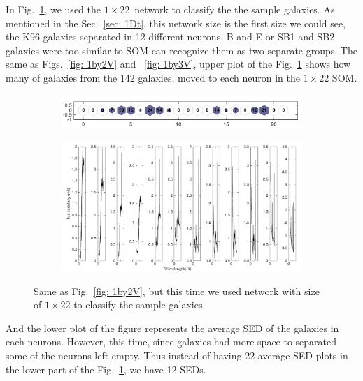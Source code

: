             In Fig.~\ref{fig: 1by22V}, we used the $1\times22$~network to classify the the sample galaxies.
            As mentioned in the Sec.~\ref{sec: 1Dt}, this network size is the first size we could see, the K96 galaxies separated in 12 different neurons.
            B and E or SB1 and SB2 galaxies were too similar to SOM can recognize them as two separate groups.
            The same as Figs.~\ref{fig: 1by2V} and ~\ref{fig: 1by3V}, upper plot of the Fig.~\ref{fig: 1by22V} shows how many of galaxies from the 142 galaxies, moved to each neuron in the $1\times22$ SOM.
            \begin{figure}
                \begin{subfigure}[b]{0.9\textwidth}
                    \centering
                    \includegraphics[width=\textwidth]{../images/1d/hit_v_1_by_22.png}
                \end{subfigure}
                \hfill
                \begin{subfigure}[b]{0.9\textwidth}
                     \includegraphics[width=\textwidth]{../images/1d/SED_total1by22.png}
                \end{subfigure}
                \caption{Same as Fig.~\ref{fig: 1by2V}, but this time we used network with size of $1\times22$ to classify the sample galaxies.}
                \label{fig: 1by22V}
            \end{figure}
            And the lower plot of the figure represents the average SED of the galaxies in each neurons.
            However, this time, since galaxies had more space to separated some of the neurons left empty. 
            Thus instead of having 22 average SED plots in the lower part of the Fig.~\ref{fig: 1by22V}, we have 12 SEDs.
            
